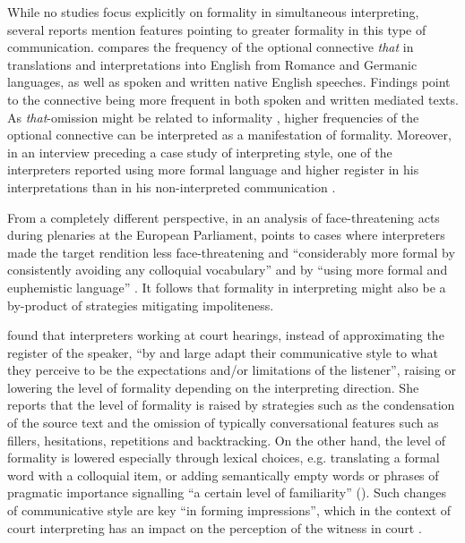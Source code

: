 \documentclass[output=paper]{langscibook}
\begin{document}
While no studies focus explicitly on formality in simultaneous interpreting, several reports mention features pointing to greater formality in this type of communication. \citet{KajzerWietrzny2012} compares the frequency of the optional connective \textit{that} in translations and interpretations into English from Romance and Germanic languages, as well as spoken and written native English speeches. Findings point to the connective being more frequent in both spoken and written mediated texts. As \textit{that}{}-omission might be related to informality \citep[145]{Biber1995}, higher frequencies of the optional connective can be interpreted as a manifestation of formality. Moreover, in an interview preceding a case study of interpreting style, one of the interpreters reported using more formal language and higher register in his interpretations than in his non-interpreted communication \citep{KajzerWietrzny2012}.

From a completely different perspective, in an analysis of face-threatening acts during plenaries at the European Parliament, \citet{Bartlomiejczyk2016} points to cases where interpreters made the target rendition less face-threatening and “considerably more formal by consistently avoiding any colloquial vocabulary” \citep[203]{Bartlomiejczyk2016} and by “using more formal and euphemistic language” \citep[211]{Bartlomiejczyk2016}. It follows that formality in interpreting might also be a by-product of strategies mitigating impoliteness.

\citet[57]{Hale1997} found that interpreters working at court hearings, instead of approximating the register of the speaker, “by and large adapt their communicative style to what they perceive to be the expectations and/or limitations of the listener”, raising or lowering the level of formality depending on the interpreting direction. She reports that the level of formality is raised by strategies such as the condensation of the source text and the omission of typically conversational features such as fillers, hesitations, repetitions and backtracking. On the other hand, the level of formality is lowered especially through lexical choices, e.g. translating a formal word with a colloquial item, or adding semantically empty words or phrases of pragmatic importance signalling “a certain level of familiarity” (\citealt[47--50]{Hale1997}). Such changes of communicative style are key “in forming impressions”, which in the context of court interpreting has an impact on the perception of the witness in court \citep[53]{Hale1997}.
\end{document}
